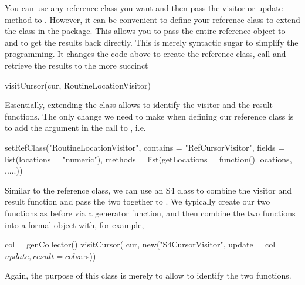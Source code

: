 You can use any reference class you want and then pass the visitor or
update method to .  However, it can be convenient to
define your reference class to extend the  class in
the  package. This allows you to pass the entire
reference object to  and to get the results back
directly. This is merely syntactic sugar to simplify the
programming. It changes the code above to create the reference class,
call  and retrieve the results to the more succinct
\begin{RCode}
visitCursor(cur, RoutineLocationVisitor)
\end{RCode}
Essentially, extending the  class allows
 to identify the visitor and the result functions.
The only change we need to make when defining our reference class
is to add the  argument in the call to
, i.e.
\begin{RCode}
setRefClass("RoutineLocationVisitor",
            contains = "RefCursorVisitor",
            fields = list(locations = "numeric"),
            methods = list(getLocations = function() locations,
                       .....))
\end{RCode}



Similar to the reference class, we can use an S4 class
 to combine the visitor and result function
and pass the two together to .
We typically create our two functions as before
via a generator function, and then combine the two 
functions into a formal object with, for example,
\begin{RCode}
col = genCollector()
visitCursor( cur, new("S4CursorVisitor",  update = col$update, result = col$vars))
\end{RCode}
Again, the purpose of this  class is merely to 
allow  to identify the two functions.

